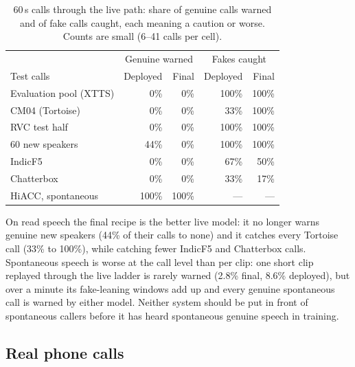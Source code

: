 \begin{table}[t]
\centering
\caption{60\,s calls through the live path: share of genuine calls warned and of fake calls
caught, each meaning a caution or worse. Counts are small (6--41 calls per cell).}
\label{tab:calls}
\footnotesize
\setlength{\tabcolsep}{3pt}
\begin{tabular}{@{}lrrrr@{}}
\toprule
 & \multicolumn{2}{c}{Genuine warned} & \multicolumn{2}{c}{Fakes caught} \\
Test calls & Deployed & Final & Deployed & Final \\
\midrule
Evaluation pool (XTTS) & 0\% & 0\% & 100\% & 100\% \\
CM04 (Tortoise) & 0\% & 0\% & 33\% & 100\% \\
RVC test half & 0\% & 0\% & 100\% & 100\% \\
60 new speakers & 44\% & 0\% & 100\% & 100\% \\
IndicF5 & 0\% & 0\% & 67\% & 50\% \\
Chatterbox & 0\% & 0\% & 33\% & 17\% \\
HiACC, spontaneous & 100\% & 100\% & --- & --- \\
\bottomrule
\end{tabular}
\end{table}

On read speech the final recipe is the better live model: it no longer warns genuine new
speakers (44\% of their calls to none) and it catches every Tortoise call (33\% to 100\%),
while catching fewer IndicF5 and Chatterbox calls. Spontaneous speech is worse at the call
level than per clip: one short clip replayed through the live ladder is rarely warned
(2.8\% final, 8.6\% deployed), but over
a minute its fake-leaning windows add up and every genuine spontaneous call is warned by
either model. Neither system should be put in front of spontaneous callers
before it has heard spontaneous genuine speech in training.

\subsection{Real phone calls}
\label{sec:real-calls}

